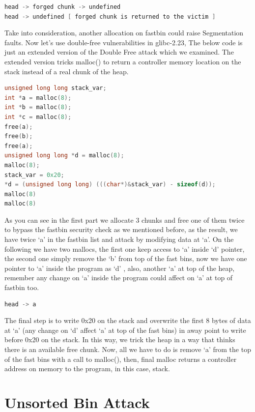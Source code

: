 \documentclass{masterthesis}
\newcommand*\libc{glibc}
\begin{document}
\begin{lstlisting}[language=c,frame=tlrb]
head -> forged chunk -> undefined
head -> undefined [ forged chunk is returned to the victim ]
\end{lstlisting}

Take into consideration, another allocation on fastbin could raise Segmentation faults.
Now let’s use double-free vulnerabilities in \libc{-2.23}, The below code is just an extended version of the Double Free attack which we examined. The extended version tricks malloc() to return a controller memory location on the stack instead of a real chunk of the heap. 

\begin{lstlisting}[language=c,frame=tlrb]
unsigned long long stack_var;
int *a = malloc(8);
int *b = malloc(8);
int *c = malloc(8);
free(a);
free(b);
free(a);
unsigned long long *d = malloc(8);
malloc(8);
stack_var = 0x20;
*d = (unsigned long long) (((char*)&stack_var) - sizeof(d));
malloc(8)
malloc(8)
\end{lstlisting}

As you can see in the first part we allocate 3 chunks and free one of them twice to bypass the fastbin security check as we mentioned before, as the result, we have twice ‘a’ in the fastbin list and attack by modifying data at ‘a’. On the following we have two mallocs, the first one keep access to ‘a’ inside ‘d’ pointer, the second one simply remove the ‘b’ from top of the fast bins, now we have one pointer to ‘a’ inside the program as ‘d’ , also, another ‘a’ at top of the heap, remember any change on ‘a’ inside the program could affect on ‘a’ at top of fastbin too.

\begin{lstlisting}[language=c,frame=tlrb]
head -> a 
\end{lstlisting}

The final step is to write 0x20 on the stack and overwrite the first 8 bytes of data at ‘a’ (any change on ‘d’ affect ‘a’ at top of the fast bins) in away point to write before 0x20 on the stack. In this way, we trick the heap in a way that thinks there is an available free chunk.
 Now, all we have to do is remove ‘a’ from the top of the fast bins with a call to malloc(), then, final malloc returns a controller address on memory to the program, in this case, stack.

\section{Unsorted Bin Attack}
\end{document}
